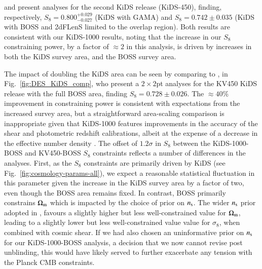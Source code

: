 \citet{vanuitert/etal:2018} and \citet{joudaki/etal:2018} present \tttp analyses for the second KiDS release (KiDS-450), finding, respectively, $S_8 = 0.800_{-0.027}^{+0.029}$ (KiDS with GAMA) and $S_8 = 0.742 \pm 0.035$ (KiDS with BOSS and 2dFLenS limited to the overlap region). 
Both results are consistent with our KiDS-1000 results, noting that the increase in our $S_8$ constraining power, by a factor of $\approx\! 2$ in this analysis, is driven by increases in both the KiDS survey area, and the BOSS survey area.  

The impact of doubling the KiDS area can be seen by comparing to \citet{troester/etal:2020}, in Fig.~\ref{fig:DES_KiDS_comp}, who present a $2\times2$pt analyses for the KV450 KiDS release with the full BOSS area, finding $S_8 = 0.728 \pm 0.026$.   The $\approx\!40\%$ improvement in constraining power is consistent with expectations from the increased survey area, but a straightforward area-scaling comparison is inappropriate given that KiDS-1000 features improvements in the accuracy of the shear and photometric redshift calibrations, albeit at the expense of a decrease in the effective number density \citep[see][for details]{giblin/etal:inprep}.  
The offset of $1.2\sigma$ in $S_8$ between the KiDS-1000-BOSS and KV450-BOSS $S_8$ constraints reflects a number of differences in the analyses.  First, as the \tttp $S_8$ constraints are primarily driven by KiDS (see Fig.~\ref{fig:cosmology-params-all}), we expect a reasonable statistical fluctuation in this parameter given the increase in the KiDS survey area by a factor of two, even though the BOSS area remains fixed.   In contrast, BOSS primarily constrains $\Omega_{\rm m}$ which is impacted by the choice of prior on $n_{\rm s}$.  The wider $n_{\rm s}$ prior adopted in \citet{troester/etal:2020}, favours a slightly higher but less well-constrained value for $\Omega_{\rm m}$, leading to a slightly lower but less well-constrained value value for $\sigma_8$, when combined with cosmic shear.   If we had also chosen an uninformative prior on $n_{\rm s}$ for our KiDS-1000-BOSS analysis, a decision that we now cannot revise post unblinding, this would have likely served to further exacerbate any tension with the Planck CMB constraints.   















